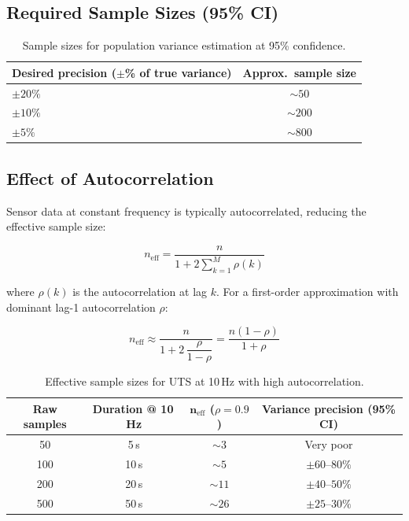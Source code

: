 \documentclass[11pt,a4paper]{article}
\begin{document}
\subsection{Required Sample Sizes (95\% CI)}

\begin{table}[H]
\centering
\begin{tabular}{@{}lc@{}}
\toprule
\textbf{Desired precision ($\pm$\% of true variance)} & \textbf{Approx.\ sample size} \\
\midrule
$\pm 20\%$ & $\sim 50$ \\
$\pm 10\%$ & $\sim 200$ \\
$\pm 5\%$  & $\sim 800$ \\
\bottomrule
\end{tabular}
\caption{Sample sizes for population variance estimation at 95\% confidence.}
\end{table}

\subsection{Effect of Autocorrelation}

Sensor data at constant frequency is typically autocorrelated, reducing the effective sample size:

\begin{equation}
    n_{\mathrm{eff}} = \frac{n}{1 + 2\displaystyle\sum_{k=1}^{M} \rho(k)}
\end{equation}

where $\rho(k)$ is the autocorrelation at lag $k$. For a first-order approximation with dominant lag-1 autocorrelation $\rho$:

\begin{equation}
    n_{\mathrm{eff}} \approx \frac{n}{1 + 2\,\dfrac{\rho}{1-\rho}} = \frac{n(1-\rho)}{1+\rho}
\end{equation}

\begin{table}[H]
\centering
\begin{tabular}{@{}cccc@{}}
\toprule
\textbf{Raw samples} & \textbf{Duration @ 10\,Hz} & $\boldsymbol{n_{\mathrm{eff}}}$ ($\rho=0.9$) & \textbf{Variance precision (95\% CI)} \\
\midrule
50  & 5\,s  & $\sim 3$  & Very poor \\
100 & 10\,s & $\sim 5$  & $\pm 60$--$80\%$ \\
200 & 20\,s & $\sim 11$ & $\pm 40$--$50\%$ \\
500 & 50\,s & $\sim 26$ & $\pm 25$--$30\%$ \\
\bottomrule
\end{tabular}
\caption{Effective sample sizes for UTS at 10\,Hz with high autocorrelation.}
\end{table}
\end{document}
